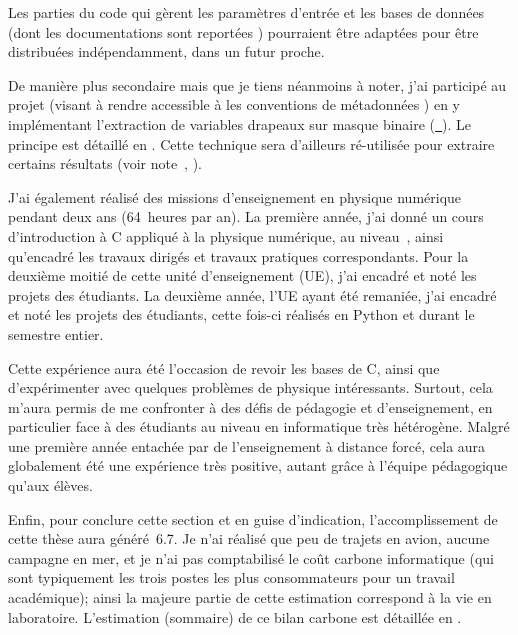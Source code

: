 Les parties du code qui gèrent les paramètres d'entrée et les bases de données (dont les documentations sont reportées ) pourraient être adaptées pour être distribuées indépendamment, dans un futur proche.

De manière plus secondaire mais que je tiens néanmoins à noter, j'ai participé au projet  (visant à rendre accessible à  les conventions de métadonnées ) en y implémentant l'extraction de variables drapeaux sur masque binaire (\href{https://github.com/xarray-contrib/cf-xarray/pull/354}{~}).
Le principe est détaillé en .
Cette technique sera d'ailleurs ré-utilisée pour extraire certains résultats (voir note~,  ).

\bigskip

J'ai également réalisé des missions d'enseignement en physique numérique pendant deux ans (64~heures par an).
La première année, j'ai donné un cours d'introduction à \hbox{C\raisebox{0.5ex}{\scriptsize\textbf{++}}} appliqué à la physique numérique, au niveau~, ainsi qu'encadré les travaux dirigés et travaux pratiques correspondants. Pour la deuxième moitié de cette unité d'enseignement (UE), j'ai encadré et noté les projets des étudiants.
La deuxième année, l'UE ayant été remaniée, j'ai encadré et noté les projets des étudiants, cette fois-ci réalisés en Python et durant le semestre entier.

Cette expérience aura été l'occasion de revoir les bases de \hbox{C\raisebox{0.5ex}{\scriptsize\textbf{++}}}, ainsi que d'expérimenter avec quelques problèmes de physique intéressants.
Surtout, cela m'aura permis de me confronter à des défis de pédagogie et d'enseignement, en particulier face à des étudiants au niveau en informatique très hétérogène.
Malgré une première année entachée par de l'enseignement à distance forcé, cela aura globalement été une expérience très positive, autant grâce à l'équipe pédagogique qu'aux élèves.

\bigskip

Enfin, pour conclure cette section et en guise d'indication, l'accomplissement de cette thèse aura généré~\qty{6.7}{\tcarbone}.
Je n'ai réalisé que peu de trajets en avion, aucune campagne en mer, et je n'ai pas comptabilisé le coût carbone informatique (qui sont typiquement les trois postes les plus consommateurs pour un travail académique); ainsi la majeure partie de cette estimation correspond à la vie en laboratoire.
L'estimation (sommaire) de ce bilan carbone est détaillée en .
